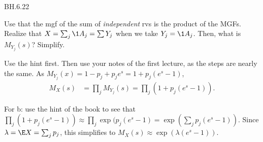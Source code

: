 
\setcounter{theorem}{21}
\begin{exercise} BH.6.22

\begin{hint}
Use that the mgf of the sum of \emph{independent} rvs is the product of the MGFs.  Realize that  $X=\sum_j \1{A_j} = \sum Y_{j}$ when we take $Y_j=\1{A_{j}}$. Then, what is $M_{Y_j}(s)$? Simplify.
\end{hint}

\begin{solution}
Use the hint first. Then use your notes of the first lecture, as the steps are nearly the same.
As $M_{Y_j}(x) = 1-p_j + p_je^{s} = 1 + p_j(e^s-1)$,
\begin{align*}
  M_X(s) &= \prod_j M_{Y_j}(s) = \prod_{j} (1+p_j(e^s-1)).
\end{align*}

For b: use the hint of the book to see that $\prod_{j} (1+p_j(e^s-1)) \approx \prod_j \exp(p_j(e^s-1) = \exp\left(\sum_j p_j (e^s-1)\right)$.
Since $\lambda = \E X = \sum_jp_j$, this simplifies to $M_X(s) \approx \exp(\lambda(e^s-1))$.

\end{solution}


\end{exercise}


